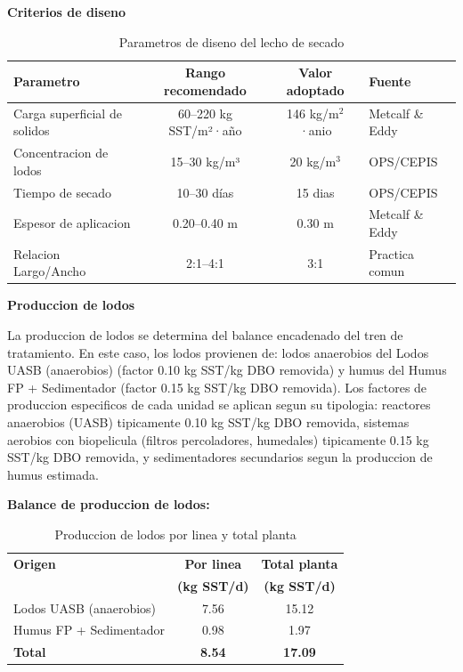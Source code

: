 \documentclass[12pt,a4paper]{article}
\begin{document}
\textbf{Criterios de diseno}

\begin{table}[H]
\centering
\caption{Parametros de diseno del lecho de secado}
\small
\begin{tabular}{lccl}
\toprule
Parametro & Rango recomendado & Valor adoptado & Fuente \\
\midrule
Carga superficial de solidos & 60--220 kg SST/m²·año & 146 kg/m$^2$·anio & Metcalf \& Eddy \cite{metcalf2014} \\
Concentracion de lodos & 15--30 kg/m³ & 20 kg/m$^3$ & OPS/CEPIS \cite{ops2005} \\
Tiempo de secado & 10--30 días & 15 dias & OPS/CEPIS \\
Espesor de aplicacion & 0.20--0.40 m & 0.30 m & Metcalf \& Eddy \\
Relacion Largo/Ancho & 2:1--4:1 & 3:1 & Practica comun \\
\bottomrule
\end{tabular}
\end{table}

\textbf{Produccion de lodos}

La produccion de lodos se determina del balance encadenado del tren de tratamiento. En este caso, los lodos provienen de: lodos anaerobios del Lodos UASB (anaerobios) (factor 0.10 kg SST/kg DBO removida) y humus del Humus FP + Sedimentador (factor 0.15 kg SST/kg DBO removida). Los factores de produccion especificos de cada unidad se aplican segun su tipologia: reactores anaerobios (UASB) tipicamente 0.10 kg SST/kg DBO removida, sistemas aerobios con biopelicula (filtros percoladores, humedales) tipicamente 0.15 kg SST/kg DBO removida, y sedimentadores secundarios segun la produccion de humus estimada.

\textbf{Balance de produccion de lodos:}

\begin{table}[H]
\centering
\small
\caption{Produccion de lodos por linea y total planta}
\begin{tabular}{p{6cm}cc}
\toprule
\textbf{Origen} & \textbf{Por linea} & \textbf{Total planta} \\
 & \textbf{(kg SST/d)} & \textbf{(kg SST/d)} \\
\midrule
Lodos UASB (anaerobios) & 7.56 & 15.12 \\
Humus FP + Sedimentador & 0.98 & 1.97 \\
\midrule
\textbf{Total} & \textbf{8.54} & \textbf{17.09} \\
\bottomrule
\end{tabular}
\end{table}
\end{document}
